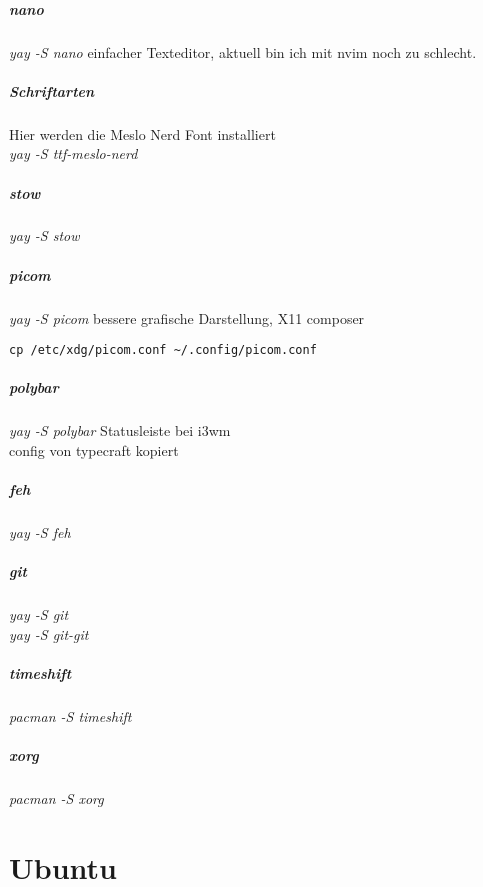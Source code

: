 \documentclass[10pt,a4paper,twoside]{book}
\begin{document}
\paragraph{nano}
\textit{yay -S nano} einfacher Texteditor, aktuell bin ich mit nvim noch zu schlecht.\\
\paragraph{Schriftarten}
Hier werden die Meslo Nerd Font installiert\\
\textit{yay -S ttf-meslo-nerd} \\
\paragraph{stow}
\textit{yay -S stow} 
\paragraph{picom}
\textit{yay -S picom} bessere grafische Darstellung, X11 composer\\
\begin{verbatim}
cp /etc/xdg/picom.conf ~/.config/picom.conf
\end{verbatim}
\paragraph{polybar}
\textit{yay -S polybar} Statusleiste bei i3wm\\
config von typecraft kopiert\\
\paragraph{feh}
\textit{yay -S feh}
\paragraph{git}
\textit{yay -S git}\\
\textit{yay -S git-git}\\
\paragraph{timeshift}
\textit{pacman -S timeshift}
\paragraph{xorg}
\textit{pacman -S xorg}

\chapter{Ubuntu}
\end{document}
